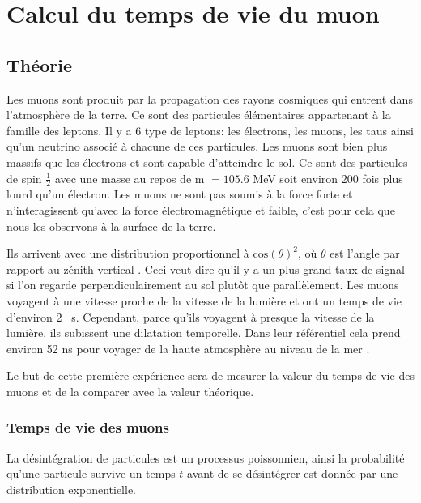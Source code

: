\documentclass[12pt]{article}
\begin{document}
\newpage
\section{Calcul du temps de vie du muon}
\subsection{Théorie}

Les muons sont produit par la propagation des rayons cosmiques qui entrent dans l'atmosphère de la terre. Ce sont des particules élémentaires appartenant à la famille des leptons. Il y a 6 type de leptons: les électrons, les muons, les taus ainsi qu'un neutrino associé à chacune de ces particules. Les muons sont bien plus massifs que les électrons et sont capable d'atteindre le sol. Ce sont des particules de spin $\frac{1}{2}$ avec une masse au repos de m $=105.6$ MeV soit environ 200 fois plus lourd qu'un électron. Les muons ne sont pas soumis à la force forte et n'interagissent qu'avec la force électromagnétique et faible, c'est pour cela que nous les observons à la surface de la terre.

Ils arrivent avec une distribution proportionnel à $\text{cos}(\theta)^2$, où $\theta$ est l'angle par rapport au zénith vertical \cite{PhysRevD.98.030001}. Ceci veut dire qu'il y a un plus grand taux de signal si l'on regarde perpendiculairement au sol plutôt que parallèlement. Les muons voyagent à une vitesse proche de la vitesse de la lumière et ont un temps de vie d'environ 2 \si{\SIUnitSymbolMicro s}. Cependant, parce qu'ils voyagent à presque la vitesse de la lumière, ils subissent une dilatation temporelle. Dans leur référentiel cela prend environ 52 ns pour voyager de la haute atmosphère au niveau de la mer \cite{vest_measuring_2010}.

Le but de cette première expérience sera de mesurer la valeur du temps de vie des muons et de la comparer avec la valeur théorique.

\subsubsection{Temps de vie des muons}
La désintégration de particules est un processus poissonnien, ainsi la probabilité qu'une particule survive un temps $t$ avant de se désintégrer est donnée par une distribution exponentielle.
\end{document}
